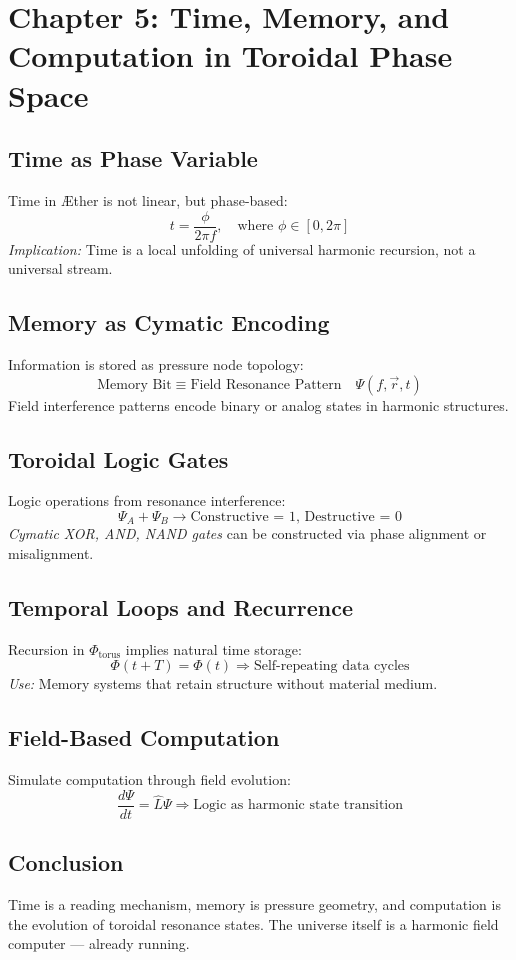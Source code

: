 \documentclass[12pt]{book}
\begin{document}
\section*{Chapter 5: Time, Memory, and Computation in Toroidal Phase Space}

\subsection*{Time as Phase Variable}
Time in Æther is not linear, but phase-based:
\[
t = \frac{\phi}{2\pi f}, \quad \text{where } \phi \in [0, 2\pi]
\]
\textit{Implication:} Time is a local unfolding of universal harmonic recursion, not a universal stream.

\subsection*{Memory as Cymatic Encoding}
Information is stored as pressure node topology:
\[
\text{Memory Bit} \equiv \text{Field Resonance Pattern} \quad \Psi(f, \vec{r}, t)
\]
Field interference patterns encode binary or analog states in harmonic structures.

\subsection*{Toroidal Logic Gates}
Logic operations from resonance interference:
\[
\Psi_A + \Psi_B \rightarrow \text{Constructive = 1, Destructive = 0}
\]
\textit{Cymatic XOR, AND, NAND gates} can be constructed via phase alignment or misalignment.

\subsection*{Temporal Loops and Recurrence}
Recursion in $\Phi_{\text{torus}}$ implies natural time storage:
\[
\Phi(t + T) = \Phi(t) \Rightarrow \text{Self-repeating data cycles}
\]
\textit{Use:} Memory systems that retain structure without material medium.

\subsection*{Field-Based Computation}
Simulate computation through field evolution:
\[
\frac{d\Psi}{dt} = \hat{L} \Psi \Rightarrow \text{Logic as harmonic state transition}
\]

\subsection*{Conclusion}
Time is a reading mechanism, memory is pressure geometry, and computation is the evolution of toroidal resonance states. The universe itself is a harmonic field computer — already running.
\end{document}
